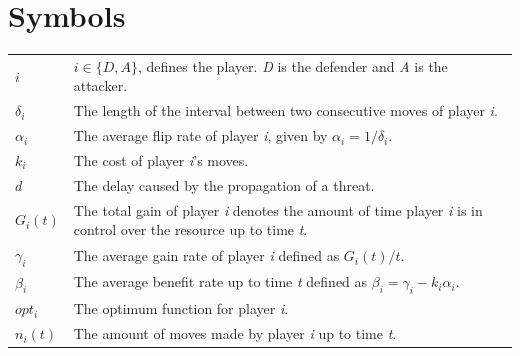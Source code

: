 \documentclass[master=cws, masteroption=vs,english]{kulemt}
\begin{document}
\section*{Symbols}
\begin{flushleft}
  \renewcommand{\arraystretch}{1.1}
  \begin{tabularx}{\textwidth}{@{}p{12mm}X@{}}
 $i$ & $i \in \{D,A\}$, defines the player. \textit{D} is the defender and \textit{A} is the attacker. \\
 $\delta_{i}$ & The length of the interval between two consecutive moves of player \textit{i}. \\
 $\alpha_{i}$ & The average flip rate of player \textit{i}, given by $\alpha_{i}=1/\delta_{i}$. \\
$k_{i}$ & The cost of player \textit{i}'s moves. \\
$d$ & The delay caused by the propagation of a threat. \\
 $G_{i}(t)$ & The total gain of player \textit{i} denotes the amount of time player \textit{i} is in control over the resource up to time \textit{t}. \\
$\gamma_{i}$ & The average gain rate of player \textit{i} defined as $G_{i}(t)/t$. \\
$\beta_{i}$ &  The average benefit rate up to time \textit{t} defined as  $\beta_{i} = \gamma_{i} -k_{i} \alpha_{i} $. \\
$opt_{i}$ & The optimum function for player \textit{i}. \\
$n_{i}(t)$ & The amount of moves made by player \textit{i} up to time \textit{t}. \\
  \end{tabularx}
\end{flushleft}

\mainmatter

%


%







%
%
%
%
%


\appendix

%

\backmatter


\end{document}
